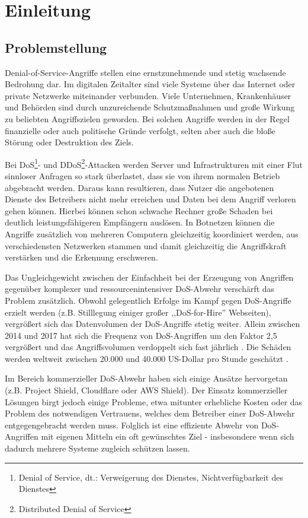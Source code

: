 \documentclass[../review_3.tex]{subfiles}
\begin{document}
\chapter{Einleitung}\thispagestyle{fancy}

\section{Problemstellung}
Denial-of-Service-Angriffe stellen eine ernstzunehmende und stetig wachsende Bedrohung dar.
Im digitalen Zeitalter sind viele Systeme über das Internet oder private Netzwerke miteinander verbunden. Viele Unternehmen, Krankenhäuser und Behörden sind durch unzureichende Schutzmaßnahmen und große Wirkung zu beliebten Angriffszielen geworden\cite{infopoint_security_cyber_angriffe}. Bei solchen Angriffe werden in der Regel finanzielle oder auch politische Gründe verfolgt, selten aber auch die bloße Störung oder Destruktion des Ziels.

Bei DoS\footnote{Denial of Service, dt.: Verweigerung des Dienstes, Nichtverfügbarkeit des Dienstes}- und DDoS\footnote{Distributed Denial of Service}-Attacken werden Server und Infrastrukturen mit einer Flut sinnloser Anfragen so stark überlastet, dass sie von ihrem normalen Betrieb abgebracht werden. Daraus kann resultieren, dass Nutzer die angebotenen Dienste des Betreibers nicht mehr erreichen und Daten bei dem Angriff verloren gehen können.
Hierbei können schon schwache Rechner große Schaden bei deutlich leistungsfähigeren Empfängern auslösen. In Botnetzen können die Angriffe zusätzlich von mehreren Computern gleichzeitig koordiniert werden, aus verschiedensten Netzwerken stammen \cite{tecchannel_gefahr_botnet} und damit gleichzeitig die Angriffskraft verstärken und die Erkennung erschweren.

Das Ungleichgewicht zwischen der Einfachheit bei der Erzeugung von Angriffen gegenüber komplexer und ressourcenintensiver DoS-Abwehr verschärft das Problem zusätzlich. Obwohl gelegentlich Erfolge im Kampf gegen DoS-Angriffe erzielt werden (z.B. Stilllegung einiger großer ,,DoS-for-Hire'' Webseiten), vergrößert sich das Datenvolumen der DoS-Angriffe stetig weiter. Allein zwischen 2014 und 2017 hat sich die Frequenz von DoS-Angriffen um den Faktor 2,5 vergrößert und das Angriffsvolumen verdoppelt sich fast jährlich \cite{neustar_ddos_report}. Die Schäden werden weltweit zwischen 20.000 und 40.000 US-Dollar pro Stunde geschätzt \cite{datacenterknowledge_study}.

Im Bereich kommerzieller DoS-Abwehr haben sich einige Ansätze hervorgetan (z.B. Project Shield\cite{projectshield}, Cloudflare\cite{cloudflare} oder AWS Shield\cite{aws_shield}). Der Einsatz kommerzieller Lösungen birgt jedoch einige Probleme, etwa mitunter erhebliche Kosten oder das Problem des notwendigen Vertrauens, welches dem Betreiber einer DoS-Abwehr entgegengebracht werden muss. Folglich ist eine effiziente Abwehr von DoS-Angriffen mit eigenen Mitteln ein oft gewünschtes Ziel - insbesondere wenn sich dadurch mehrere Systeme zugleich schützen lassen.
\end{document}
